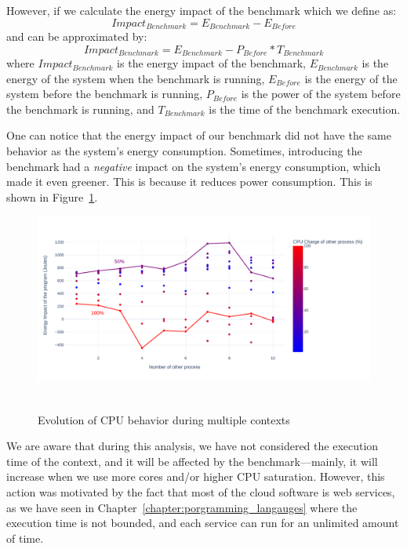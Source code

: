 However, if we calculate the energy impact of the benchmark which we define as:
\begin{equation}
    Impact_{Benchmark} =E_{Benchmark} - E_{Before}
\end{equation}
and can be approximated by:
\begin{equation}
    Impact_{Benchmark} =E_{Benchmark} - P_{Before} * T_{Benchmark}
\end{equation}
where $Impact_{Benchmark}$ is the energy impact of the benchmark, $E_{Benchmark}$ is the energy of the system when the benchmark is running, $E_{Before}$ is the energy of the system before the benchmark is running, $P_{Before}$ is the power of the system before the benchmark is running, and $T_{Benchmark}$ is the time of the benchmark execution.

One can notice that the energy impact of our benchmark did not have the same behavior as the system's energy consumption.
Sometimes, introducing the benchmark had a \emph{negative} impact on the system's energy consumption, which made it even greener.
This is because it reduces power consumption.
This is shown in Figure~\ref{fig:green_faas_impact}.

\begin{figure}[!t]
    \centering
    \caption{Evolution of CPU behavior during multiple contexts }
    \includegraphics[width=\linewidth]{chapters/green_faas_impact}\
    \label{fig:green_faas_impact}
\end{figure}

We are aware that during this analysis, we have not considered the execution time of the context, and it will be affected by the benchmark---mainly, it will increase when we use more cores and/or higher CPU saturation.
However, this action was motivated by the fact that most of the cloud software is web services, as we have seen in Chapter~\ref{chapter:porgramming_langauges} where the execution time is not bounded, and each service can run for an unlimited amount of time.

